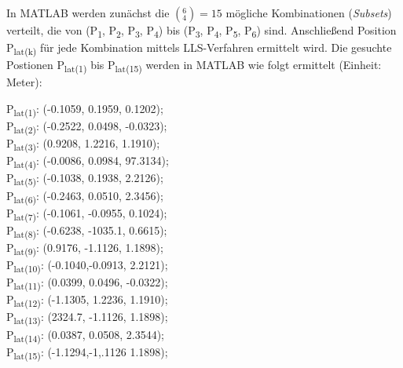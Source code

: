 In MATLAB werden zunächst die $(^6_4) = 15$ mögliche Kombinationen (\textit{Subsets}) verteilt, die von (P\textsubscript{1}, P\textsubscript{2}, P\textsubscript{3}, P\textsubscript{4}) bis (P\textsubscript{3}, P\textsubscript{4}, P\textsubscript{5}, P\textsubscript{6}) sind. Anschließend Position P\textsubscript{lat(k)} für jede Kombination mittels LLS-Verfahren ermittelt wird. Die gesuchte Postionen P\textsubscript{lat(1)} bis P\textsubscript{lat(15)} werden in MATLAB wie folgt ermittelt (Einheit: Meter):
\begin{flushleft}
P\textsubscript{lat(1)}: (-0.1059, 0.1959, 0.1202);\\
P\textsubscript{lat(2)}: (-0.2522, 0.0498, -0.0323);\\
P\textsubscript{lat(3)}: (0.9208,  1.2216, 1.1910);\\
P\textsubscript{lat(4)}: (-0.0086, 0.0984, 97.3134);\\
P\textsubscript{lat(5)}: (-0.1038, 0.1938, 2.2126);\\
P\textsubscript{lat(6)}: (-0.2463, 0.0510, 2.3456);\\
P\textsubscript{lat(7)}: (-0.1061, -0.0955, 0.1024);\\
P\textsubscript{lat(8)}: (-0.6238, -1035.1, 0.6615);\\
P\textsubscript{lat(9)}: (0.9176, -1.1126, 1.1898);\\
P\textsubscript{lat(10)}: (-0.1040,-0.0913, 2.2121);\\
P\textsubscript{lat(11)}: (0.0399, 0.0496, -0.0322);\\
P\textsubscript{lat(12)}: (-1.1305, 1.2236, 1.1910);\\
P\textsubscript{lat(13)}: (2324.7, -1.1126, 1.1898);\\
P\textsubscript{lat(14)}: (0.0387, 0.0508, 2.3544);\\
P\textsubscript{lat(15)}: (-1.1294,-1,.1126 1.1898);
\end{flushleft}

